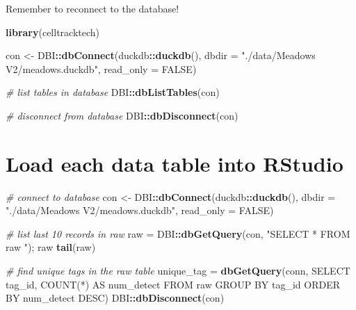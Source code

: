 \documentclass[
]{book}
\newenvironment{Shaded}{\begin{snugshade}}{\end{snugshade}}
\newcommand{\AttributeTok}[1]{\textcolor[rgb]{0.13,0.29,0.53}{#1}}
\newcommand{\CommentTok}[1]{\textcolor[rgb]{0.56,0.35,0.01}{\textit{#1}}}
\newcommand{\ConstantTok}[1]{\textcolor[rgb]{0.56,0.35,0.01}{#1}}
\newcommand{\FunctionTok}[1]{\textcolor[rgb]{0.13,0.29,0.53}{\textbf{#1}}}
\newcommand{\NormalTok}[1]{#1}
\newcommand{\OtherTok}[1]{\textcolor[rgb]{0.56,0.35,0.01}{#1}}
\newcommand{\SpecialCharTok}[1]{\textcolor[rgb]{0.81,0.36,0.00}{\textbf{#1}}}
\newcommand{\StringTok}[1]{\textcolor[rgb]{0.31,0.60,0.02}{#1}}
\begin{document}
Remember to reconnect to the database!

\begin{Shaded}
\begin{Highlighting}[]
\FunctionTok{library}\NormalTok{(celltracktech)}

\NormalTok{con }\OtherTok{\textless{}{-}}\NormalTok{ DBI}\SpecialCharTok{::}\FunctionTok{dbConnect}\NormalTok{(duckdb}\SpecialCharTok{::}\FunctionTok{duckdb}\NormalTok{(), }
                      \AttributeTok{dbdir =} \StringTok{"./data/Meadows V2/meadows.duckdb"}\NormalTok{, }
                      \AttributeTok{read\_only =} \ConstantTok{FALSE}\NormalTok{)}

\CommentTok{\# list tables in database}
\NormalTok{DBI}\SpecialCharTok{::}\FunctionTok{dbListTables}\NormalTok{(con)}

\CommentTok{\# disconnect from database}
\NormalTok{DBI}\SpecialCharTok{::}\FunctionTok{dbDisconnect}\NormalTok{(con)}
\end{Highlighting}
\end{Shaded}

\section{Load each data table into RStudio}\label{load-each-data-table-into-rstudio}

\begin{Shaded}
\begin{Highlighting}[]
\CommentTok{\# connect to database}
\NormalTok{con }\OtherTok{\textless{}{-}}\NormalTok{ DBI}\SpecialCharTok{::}\FunctionTok{dbConnect}\NormalTok{(duckdb}\SpecialCharTok{::}\FunctionTok{duckdb}\NormalTok{(), }
                      \AttributeTok{dbdir =} \StringTok{"./data/Meadows V2/meadows.duckdb"}\NormalTok{, }
                      \AttributeTok{read\_only =} \ConstantTok{FALSE}\NormalTok{)}

\CommentTok{\# list last 10 records in raw}
\NormalTok{raw }\OtherTok{=}\NormalTok{ DBI}\SpecialCharTok{::}\FunctionTok{dbGetQuery}\NormalTok{(con, }\StringTok{"SELECT * FROM raw "}\NormalTok{); raw}
\FunctionTok{tail}\NormalTok{(raw)}

\CommentTok{\# find unique tags in the raw table}
\NormalTok{unique\_tag }\OtherTok{=} \FunctionTok{dbGetQuery}\NormalTok{(conn,}
                          \StringTok{\textquotesingle{}SELECT tag\_id, COUNT(*) AS num\_detect}
\StringTok{                          FROM raw}
\StringTok{                          GROUP BY tag\_id}
\StringTok{                          ORDER BY num\_detect DESC\textquotesingle{}}\NormalTok{)}
\NormalTok{DBI}\SpecialCharTok{::}\FunctionTok{dbDisconnect}\NormalTok{(con)}
\end{Highlighting}
\end{Shaded}
\end{document}

